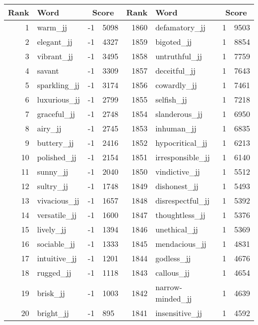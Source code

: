 \begin{table}[tbp]
    \begin{tabular}{| rlr@{.}l | rlr@{.}l |}
    \hline
    \textbf{Rank} & \textbf{Word} & \multicolumn{2}{c|}{\textbf{Score}} & \textbf{Rank} & \textbf{Word} & \multicolumn{2}{c|}{\textbf{Score}} \\
    \hline
    1 & warm\_jj & -1 & 5098    &    1860 & defamatory\_jj & 1 & 9503 \\
    2 & elegant\_jj & -1 & 4327    &    1859 & bigoted\_jj & 1 & 8854 \\
    3 & vibrant\_jj & -1 & 3495    &    1858 & untruthful\_jj & 1 & 7759 \\
    4 & savant & -1 & 3309    &    1857 & deceitful\_jj & 1 & 7643 \\
    5 & sparkling\_jj & -1 & 3174    &    1856 & cowardly\_jj & 1 & 7461 \\
    6 & luxurious\_jj & -1 & 2799    &    1855 & selfish\_jj & 1 & 7218 \\
    7 & graceful\_jj & -1 & 2748    &    1854 & slanderous\_jj & 1 & 6950 \\
    8 & airy\_jj & -1 & 2745    &    1853 & inhuman\_jj & 1 & 6835 \\
    9 & buttery\_jj & -1 & 2416    &    1852 & hypocritical\_jj & 1 & 6213 \\
    10 & polished\_jj & -1 & 2154    &    1851 & irresponsible\_jj & 1 & 6140 \\
    11 & sunny\_jj & -1 & 2040    &    1850 & vindictive\_jj & 1 & 5512 \\
    12 & sultry\_jj & -1 & 1748    &    1849 & dishonest\_jj & 1 & 5493 \\
    13 & vivacious\_jj & -1 & 1657    &    1848 & disrespectful\_jj & 1 & 5392 \\
    14 & versatile\_jj & -1 & 1600    &    1847 & thoughtless\_jj & 1 & 5376 \\
    15 & lively\_jj & -1 & 1394    &    1846 & unethical\_jj & 1 & 5369 \\
    16 & sociable\_jj & -1 & 1333    &    1845 & mendacious\_jj & 1 & 4831 \\
    17 & intuitive\_jj & -1 & 1201    &    1844 & godless\_jj & 1 & 4676 \\
    18 & rugged\_jj & -1 & 1118    &    1843 & callous\_jj & 1 & 4654 \\
    19 & brisk\_jj & -1 & 1003    &    1842 & narrow-minded\_jj & 1 & 4639 \\
    20 & bright\_jj & -1 & 895    &    1841 & insensitive\_jj & 1 & 4592 \\

\end{tabular}
\end{table}

